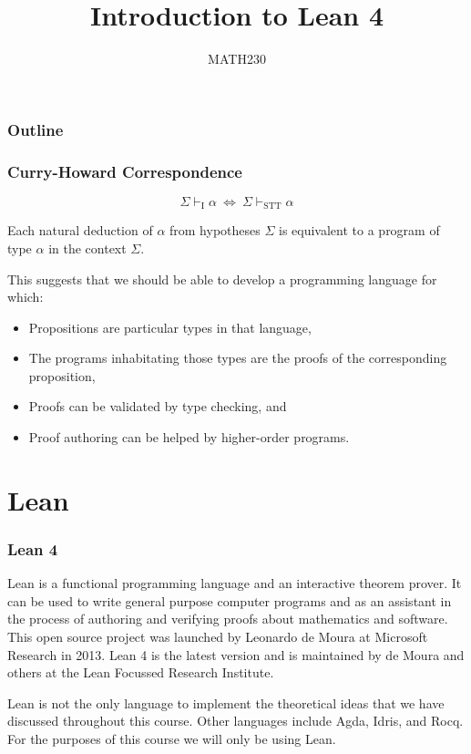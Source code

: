 \documentclass{beamer}
\title{Introduction to Lean 4}
\author{MATH230}
\institute{School of Mathematics and Statistics \\ University of Canterbury}
\date{}
\theoremstyle{indentDefn} \newtheorem{defn}[]{Definition}
\begin{document}
\begin{frame}

  \titlepage

\end{frame}

\begin{frame}
  \frametitle{Outline}

  \tableofcontents

\end{frame}

\begin{frame}
\frametitle{Curry-Howard Correspondence}

$$\Sigma \vdash_{\text{I}} \alpha \ \iff \ \Sigma \vdash_{\text{STT}} \alpha$$

Each natural deduction of $\alpha$ from hypotheses $\Sigma$ is equivalent to a program of type $\alpha$ in the context $\Sigma$.

This suggests that we should be able to develop a programming language for which:

\begin{itemize}
	\item Propositions are particular types in that language,
	\item The programs inhabitating those types are the proofs of the corresponding proposition,
	\item Proofs can be validated by type checking, and
	\item Proof authoring can be helped by higher-order programs.
\end{itemize}
\end{frame}

\section{Lean}

\begin{frame}
\frametitle{Lean 4}
Lean is a functional programming language and an interactive theorem prover. It can be used to write general purpose computer programs and as an assistant in the process of authoring and verifying proofs about mathematics and software. This open source project was launched by Leonardo de Moura at Microsoft Research in 2013. Lean 4 is the latest version and is maintained by de Moura and others at the Lean Focussed Research Institute.

Lean is not the only language to implement the theoretical ideas that we have discussed throughout this course. Other languages include Agda, Idris, and Rocq. For the purposes of this course we will only be using Lean. 
\end{frame}
\end{document}
